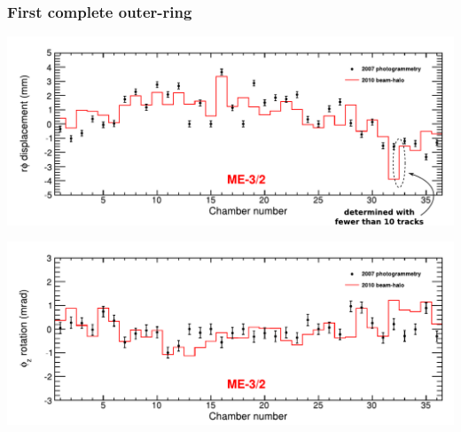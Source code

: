 \documentclass[compress]{beamer}
\begin{document}
\begin{frame}
\frametitle{First complete outer-ring}
\begin{center}
\includegraphics[width=0.9\linewidth]{compare_mem32_x.pdf}

\includegraphics[width=0.9\linewidth]{compare_mem32_phiz.pdf}
\end{center}
\end{frame}


\end{document}
